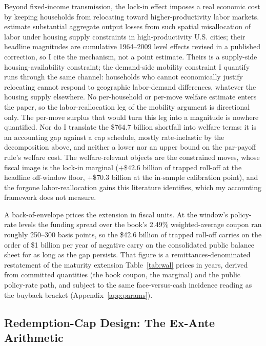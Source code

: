\documentclass[12pt]{article}
\begin{document}
Beyond fixed-income transmission, the lock-in effect imposes a real economic cost by keeping households from relocating toward higher-productivity labor markets. \citet{hsieh2019} estimate substantial aggregate output losses from such spatial misallocation of labor under housing supply constraints in high-productivity U.S. cities; their headline magnitudes are cumulative 1964--2009 level effects revised in a published correction, so I cite the mechanism, not a point estimate. Theirs is a supply-side housing-availability constraint; the demand-side mobility constraint I quantify runs through the same channel: households who cannot economically justify relocating cannot respond to geographic labor-demand differences, whatever the housing supply elsewhere. No per-household or per-move welfare estimate enters the paper, so the labor-reallocation leg of the mobility argument is directional only. The per-move surplus that would turn this leg into a magnitude is nowhere quantified. Nor do I translate the \$764.7 billion shortfall into welfare terms: it is an accounting gap against a cap schedule, mostly rate-inelastic by the decomposition above, and neither a lower nor an upper bound on the par-payoff rule's welfare cost. The welfare-relevant objects are the constrained moves, whose fiscal image is the lock-in marginal ($+\$42.6$ billion of trapped roll-off at the headline off-window floor, $+\$70.3$ billion at the in-sample calibration point), and the forgone labor-reallocation gains this literature identifies, which my accounting framework does not measure.

A back-of-envelope prices the extension in fiscal units. At the window's policy-rate levels the funding spread over the book's 2.49\% weighted-average coupon ran roughly 250--300 basis points, so the \$42.6 billion of trapped roll-off carries on the order of \$1 billion per year of negative carry on the consolidated public balance sheet for as long as the gap persists. That figure is a remittances-denominated restatement of the maturity extension Table~\ref{tab:wal} prices in years, derived from committed quantities (the book coupon, the marginal) and the public policy-rate path, and subject to the same face-versus-cash incidence reading as the buyback bracket (Appendix~\ref{app:params}).

\subsection{Redemption-Cap Design: The Ex-Ante Arithmetic}\label{sec:discussion-capdesign}
\end{document}
